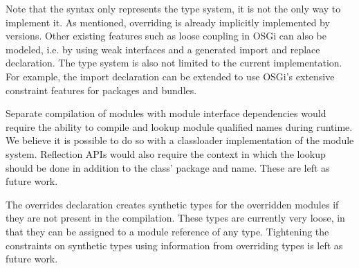 
Note that the syntax only represents the type system, it is not the only way
to implement it. As mentioned, overriding is already implicitly implemented
by versions. Other existing features such as loose coupling in OSGi can
also be modeled, i.e. by using weak interfaces and a generated import and replace
declaration. The type system is also not limited to
the current implementation. For example, the import declaration can be 
extended to use OSGi's extensive constraint features for packages and bundles.

Separate compilation of modules with module interface dependencies would require
the ability to compile and lookup module qualified names during runtime. We believe
it is possible to do so with a classloader implementation of the module system. Reflection
APIs would also require the context in which the lookup should be done in addition to
the class' package and name. These are left as future work.

The overrides declaration creates synthetic types for the overridden modules 
if they are not present in the compilation. These types are currently very loose,
in that they can be assigned to a module reference of any type. Tightening the
constraints on synthetic types using information from overriding types is left
as future work.
